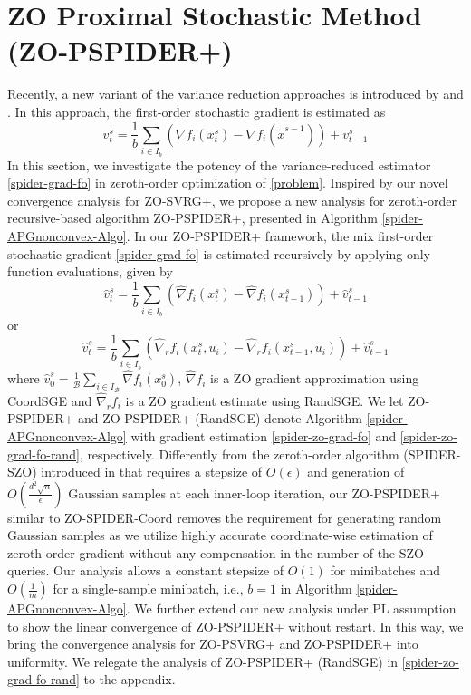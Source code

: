 \documentclass[iicol,sn-basic]{sn-jnl}
\theoremstyle{thmstyleone}%
\theoremstyle{thmstyletwo}%
\theoremstyle{thmstylethree}%
\begin{document}
\section{ZO Proximal Stochastic Method (ZO-PSPIDER+)}
Recently, a new variant of the variance reduction approaches is introduced by \cite{nguyen2017sarah,nguyen2017stochastic} and \cite{fang2018spider}. In this approach, the first-order stochastic gradient is estimated as 
\begin{equation}\label{spider-grad-fo}
{{v}}_{t}^s = \frac{1}{b} \sum_{i\in I_b}\left({\nabla} f_{i}(x_{t}^s)-{\nabla} f_{i}(\tilde{x}^{s-1})\right)+v_{t-1}^s
\end{equation}
In this section, we investigate the potency of the variance-reduced estimator \eqref{spider-grad-fo} in zeroth-order optimization of \eqref{problem}. Inspired
by our novel convergence analysis for ZO-SVRG+, we propose a new analysis for zeroth-order recursive-based algorithm ZO-PSPIDER+, presented in Algorithm \ref{spider-APGnonconvex-Algo}. In our ZO-PSPIDER+ framework, the mix first-order stochastic gradient \eqref{spider-grad-fo} is estimated recursively by applying only function evaluations, given by
\begin{equation}\label{spider-zo-grad-fo}
{\hat{v}}_{t}^s = \frac{1}{b} \sum_{i\in I_b}\left(\hat{\nabla} f_{i}(x_{t}^s)-\hat{\nabla} f_{i}({x}_{t-1}^{s})\right)+\hat{v}_{t-1}^s
\end{equation}
or 
\begin{equation}\label{spider-zo-grad-fo-rand}
{\hat{v}}_{t}^s = \frac{1}{b} \sum_{i\in I_b}\left(\hat{\nabla}_r f_{i}(x_{t}^s, u_i)-\hat{\nabla}_r f_{i}({x}_{t-1}^{s}, u_i)\right)+\hat{v}_{t-1}^s
\end{equation}
where $\hat{v}_0^s= \frac{1}{\mathcal{B}}\sum_{i\in I_{\mathcal{B}}}\hat{\nabla} f_{i}({x}_0^{s})$,   $\hat{\nabla} f_{i}$ is a ZO gradient approximation using CoordSGE and $\hat{\nabla}_r f_{i}$ is a ZO gradient estimate using RandSGE.  We let ZO-PSPIDER+ and ZO-PSPIDER+ (RandSGE) denote Algorithm \ref{spider-APGnonconvex-Algo} with gradient estimation \eqref{spider-zo-grad-fo} and \eqref{spider-zo-grad-fo-rand}, respectively. Differently from the zeroth-order algorithm (SPIDER-SZO) introduced in \cite{fang2018spider} that
requires a stepsize of $O(\epsilon)$ and generation of $O(\frac{d^2\sqrt{n}}{\epsilon})$ Gaussian samples at each inner-loop iteration, our ZO-PSPIDER+ similar to ZO-SPIDER-Coord \cite{ji2019improved} removes the requirement for generating random Gaussian samples as we utilize highly accurate coordinate-wise estimation of zeroth-order gradient without any compensation in the number of the SZO queries. Our analysis allows a constant stepsize of $O(1)$ for minibatches and $O(\frac{1}{m})$ for a single-sample minibatch, i.e., $b = 1$ in Algorithm \ref{spider-APGnonconvex-Algo}. We further extend our new analysis under PL assumption to show the linear convergence of ZO-PSPIDER+ without restart. In this way, we bring the convergence analysis for ZO-PSVRG+ and ZO-PSPIDER+ into uniformity. We relegate the analysis of ZO-PSPIDER+ (RandSGE) in \eqref{spider-zo-grad-fo-rand} to the appendix. 
\end{document}
